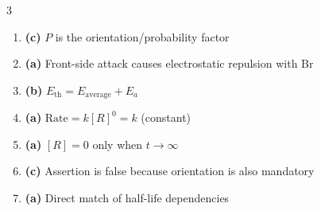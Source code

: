 \documentclass[11pt, a4paper]{article}
\begin{document}
\begin{multicols}{3}
\begin{enumerate}
    \item \textbf{(c)} $P$ is the orientation/probability factor
    \item \textbf{(a)} Front-side attack causes electrostatic repulsion with $\text{Br}$
    \item \textbf{(b)} $E_{\text{th}} = E_{\text{average}} + E_a$
    \item \textbf{(a)} $\text{Rate} = k[R]^0 = k$ (constant)
    \item \textbf{(a)} $[R] = 0$ only when $t \to \infty$
    \item \textbf{(c)} Assertion is false because orientation is also mandatory
    \item \textbf{(a)} Direct match of half-life dependencies
\end{enumerate}
\end{multicols}
\end{document}

